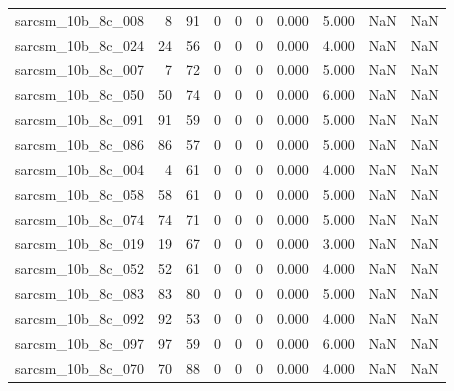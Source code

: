 \documentclass{article}
\begin{document}
\begin{longtable}{lrrrrrrrrr}
sarcsm\_10b\_8c\_008 & 8 & 91 & 0 & 0 & 0 & 0.000 & 5.000 & NaN & NaN \\
sarcsm\_10b\_8c\_024 & 24 & 56 & 0 & 0 & 0 & 0.000 & 4.000 & NaN & NaN \\
sarcsm\_10b\_8c\_007 & 7 & 72 & 0 & 0 & 0 & 0.000 & 5.000 & NaN & NaN \\
sarcsm\_10b\_8c\_050 & 50 & 74 & 0 & 0 & 0 & 0.000 & 6.000 & NaN & NaN \\
sarcsm\_10b\_8c\_091 & 91 & 59 & 0 & 0 & 0 & 0.000 & 5.000 & NaN & NaN \\
sarcsm\_10b\_8c\_086 & 86 & 57 & 0 & 0 & 0 & 0.000 & 5.000 & NaN & NaN \\
sarcsm\_10b\_8c\_004 & 4 & 61 & 0 & 0 & 0 & 0.000 & 4.000 & NaN & NaN \\
sarcsm\_10b\_8c\_058 & 58 & 61 & 0 & 0 & 0 & 0.000 & 5.000 & NaN & NaN \\
sarcsm\_10b\_8c\_074 & 74 & 71 & 0 & 0 & 0 & 0.000 & 5.000 & NaN & NaN \\
sarcsm\_10b\_8c\_019 & 19 & 67 & 0 & 0 & 0 & 0.000 & 3.000 & NaN & NaN \\
sarcsm\_10b\_8c\_052 & 52 & 61 & 0 & 0 & 0 & 0.000 & 4.000 & NaN & NaN \\
sarcsm\_10b\_8c\_083 & 83 & 80 & 0 & 0 & 0 & 0.000 & 5.000 & NaN & NaN \\
sarcsm\_10b\_8c\_092 & 92 & 53 & 0 & 0 & 0 & 0.000 & 4.000 & NaN & NaN \\
sarcsm\_10b\_8c\_097 & 97 & 59 & 0 & 0 & 0 & 0.000 & 6.000 & NaN & NaN \\
sarcsm\_10b\_8c\_070 & 70 & 88 & 0 & 0 & 0 & 0.000 & 4.000 & NaN & NaN \\
\end{longtable}
\end{document}
